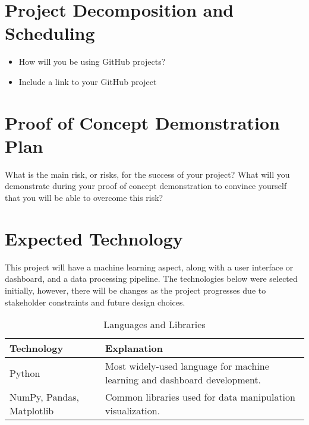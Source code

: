 \documentclass{article}
\begin{document}
\section{Project Decomposition and Scheduling}

\begin{itemize}
  \item How will you be using GitHub projects?
  \item Include a link to your GitHub project
\end{itemize}


\section{Proof of Concept Demonstration Plan}

What is the main risk, or risks, for the success of your project?  What will you
demonstrate during your proof of concept demonstration to convince yourself that
you will be able to overcome this risk?

\section{Expected Technology}

This project will have a machine learning aspect, along with a user interface or dashboard, and a data processing pipeline. The technologies below were selected initially, however, there will be changes as the project progresses due to stakeholder constraints and future design choices.

\begin{table}[H]
\caption{Languages and Libraries} \label{TblLanguagesAndLibraries}
\begin{tabularx}{\textwidth}{p{3.5cm}p{7cm}}
\toprule
\textbf{Technology} & \textbf{Explanation}\\
\midrule
Python & Most widely-used language for machine learning and dashboard development.\\
\addlinespace
NumPy, Pandas, Matplotlib & Common libraries used for data manipulation visualization.\\
\bottomrule
\end{tabularx}
\end{table}
\end{document}
